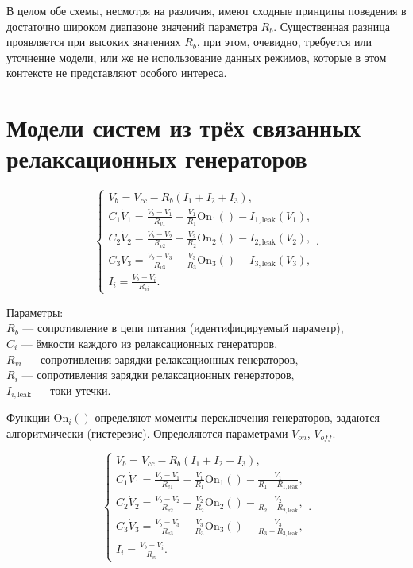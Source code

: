 В целом обе схемы, несмотря на различия, имеют сходные принципы поведения
в достаточно широком диапазоне значений параметра $R_b$.
Существенная разница проявляется при высоких значениях $R_b$,
при этом, очевидно, требуется или уточнение модели, или же
не использование данных режимов, которые в этом контексте не представляют
особого интереса.



\section{Модели систем из трёх связанных релаксационных генераторов}

\begin{equation}
  \begin{cases}
    V_b = V_{cc} - R_b ( I_1 + I_2 + I_3 ), \\
      C_1 \dot{V}_1 = \frac{V_b-V_1}{R_{v1}} - \frac{V_1}{R_1} \mathrm{On}_1() - I_{1,\mathrm{leak}}(V_1), \\
      C_2 \dot{V}_2 = \frac{V_b-V_2}{R_{v2}} - \frac{V_2}{R_2} \mathrm{On}_2() - I_{2,\mathrm{leak}}(V_2), \\
      C_3 \dot{V}_3 = \frac{V_b-V_3}{R_{v3}} - \frac{V_3}{R_3} \mathrm{On}_3() - I_{3,\mathrm{leak}}(V_3), \\
      I_i = \frac{V_b-V_i}{R_{vi}}.
  \end{cases}.
    \label{atu:eq:relax3}
\end{equation}

Параметры: \\
$R_b$ --- сопротивление в цепи питания (идентифицируемый параметр), \\
$C_i$ --- ёмкости каждого из релаксационных генераторов, \\
$R_{vi}$ --- сопротивления зарядки релаксационных генераторов, \\
$R_{i}$ --- сопротивления зарядки релаксационных генераторов, \\
$I_{i,\mathrm{leak}}$ --- токи утечки.

Функции $ \mathrm{On}_i() $ определяют моменты переключения генераторов,
задаются алгоритмически (гистерезис). Определяются параметрами
$V_{on}$, $V_{off}$.

\begin{equation}
  \begin{cases}
    V_b = V_{cc} - R_b ( I_1 + I_2 + I_3 ), \\
      C_1 \dot{V}_1 = \frac{V_b-V_1}{R_{v1}} - \frac{V_1}{R_1} \mathrm{On}_1() - \frac{V_1}{R_1+R_{1,\mathrm{leak}}}, \\
      C_2 \dot{V}_2 = \frac{V_b-V_2}{R_{v2}} - \frac{V_2}{R_2} \mathrm{On}_2() - \frac{V_2}{R_2+R_{2,\mathrm{leak}}}, \\
      C_3 \dot{V}_3 = \frac{V_b-V_3}{R_{v3}} - \frac{V_3}{R_3} \mathrm{On}_3() - \frac{V_3}{R_3+R_{3,\mathrm{leak}}}, \\
      I_i = \frac{V_b-V_i}{R_{vi}}.
  \end{cases}.
    \label{atu:eq:relax3_linleak}
\end{equation}

